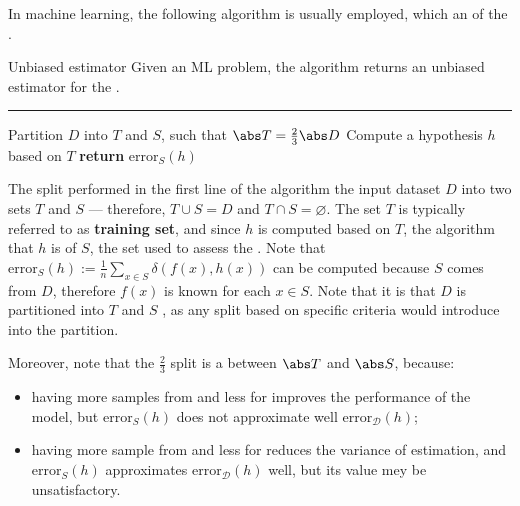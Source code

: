 \documentclass[a4paper, 12pt]{report}
\begin{document}
    In machine learning, the following algorithm is usually employed, which  an  of the .

    \begin{framedalgo}{Unbiased estimator}
        Given an ML problem, the algorithm returns an unbiased estimator for the . \\
        \hrule
        \quad
        \label{alg:unbiased_estimator}
        \begin{algorithmic}[1]
                \State Partition $D$ into $T$ and $S$, such that $\abs T = \frac{2}{3}\abs D$
                \State Compute a hypothesis $h$ based on $T$
                \State \textbf{return} $\mathrm{error}_S(h)$
            \EndFunction
        \end{algorithmic}
    \end{framedalgo}

    The split performed in the first line of the algorithm  the input dataset $D$ into two sets $T$ and $S$ --- therefore, $T \cup S = D$ and $T \cap S = \varnothing$. The set $T$ is typically referred to as \textbf{training set}, and since $h$ is computed based on $T$, the algorithm  that $h$ is  of $S$, the set used to assess the . Note that $\mathrm{error}_S(h) := \frac{1}{n} \sum_{x \in S}{\delta(f(x), h(x))}$ can be computed because $S$ comes from $D$, therefore $f(x)$ is known for each $x \in S$. Note that it is  that $D$ is partitioned into $T$ and $S$ , as any split based on specific criteria would introduce  into the partition.

    Moreover, note that the $\frac{2}{3}$ split is a  between $\abs T$ and $\abs S$, because:

    \begin{itemize}
        \item having more samples from  and less for  improves the performance of the model, but $\mathrm{error}_S(h)$ does not approximate well $\mathrm{error}_\mathcal D (h)$;
        \item having more sample from  and less for  reduces the variance of estimation, and $\mathrm{error}_S(h)$ approximates $\mathrm{error}_\mathcal D (h)$ well, but its value mey be unsatisfactory.
    \end{itemize}
\end{document}
